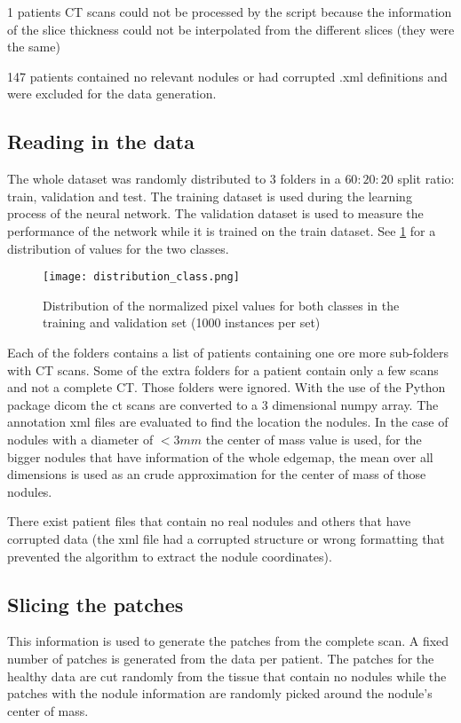 \documentclass[../Thesis.tex]{subfiles}
\begin{document}
1 patients CT scans could not be processed by the script because the information of the slice thickness could not be interpolated from the different slices (they were the same)

147 patients contained no relevant nodules or had corrupted .xml definitions and were excluded for the data generation.

\subsection{Reading in the data}
The whole dataset was randomly distributed to 3 folders in a $60:20:20$ split ratio: train, validation and test. The training dataset is used during the learning process of the neural network. The validation dataset is used to measure the performance of the network while it is trained on the train dataset. See \ref{fig:ttdist} for a distribution of values for the two classes. 
\begin{figure}
\texttt{[image: distribution\_class.png]}
\caption{Distribution of the normalized pixel values for both classes in the training and validation set (1000 instances per set)}
\label{fig:ttdist}
\end{figure}
Each of the folders contains a list of patients containing one ore more sub-folders with CT scans. Some of the extra folders for a patient contain only a few scans and not a complete CT. Those folders were ignored. With the use of the Python package dicom \cite{mason2011t} the ct scans are converted to a 3 dimensional numpy array. The annotation xml files are evaluated to find the location the nodules. In the case of nodules with a diameter of $<3mm$ the center of mass value is used, for the bigger nodules that have information of the whole edgemap, the mean over all dimensions is used as an crude approximation for the center of mass of those nodules. 

There exist patient files that contain no real nodules and others that have corrupted data (the xml file had a corrupted structure or wrong formatting that prevented the algorithm to extract the nodule coordinates).

\subsection{Slicing the patches}
This information is used to generate the patches from the complete scan. A fixed number of patches is generated from the data per patient. The patches for the healthy data are cut randomly from the tissue that contain no nodules while the patches with the nodule information are randomly picked around the nodule's center of mass.
\end{document}
